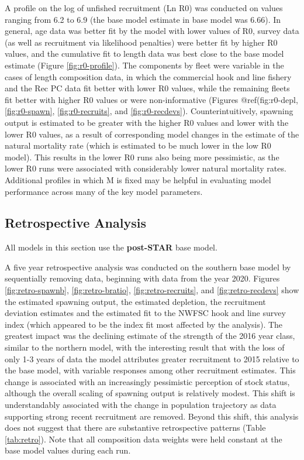 \documentclass[
  english,
  a4paper,
]{article}
\begin{document}
A profile on the log of unfished recruitment (Ln R0) was conducted on values ranging from 6.2 to 6.9 (the base model estimate in base model was 6.66). In general, age data was better fit by the model with lower values of R0, survey data (as well as recruitment via likelihood penalties) were better fit by higher R0 values, and the cumulative fit to length data was best close to the base model estimate (Figure \ref{fig:r0-profile}). The components by fleet were variable in the cases of length composition data, in which the commercial hook and line fishery and the Rec PC data fit better with lower R0 values, while the remaining fleets fit better with higher R0 values or were non-informative (Figures @ref(fig:r0-depl, \ref{fig:r0-spawn}, \ref{fig:r0-recruits}, and \ref{fig:r0-recdevs}). Counterintuitively, spawning output is estimated to be greater with the higher R0 values and lower with the lower R0 values, as a result of corresponding model changes in the estimate of the natural mortality rate (which is estimated to be much lower in the low R0 model). This results in the lower R0 runs also being more pessimistic, as the lower R0 runs were associated with considerably lower natural mortality rates. Additional profiles in which M is fixed may be helpful in evaluating model performance across many of the key model parameters.

\hypertarget{retrospective-analysis}{%
\subsection{Retrospective Analysis}\label{retrospective-analysis}}

All models in this section use the \textbf{post-STAR} base model.

A five year retrospective analysis was conducted on the southern base model by sequentially removing data, beginning with data from the year 2020. Figures \ref{fig:retro-spawnb}, \ref{fig:retro-bratio}, \ref{fig:retro-recruits}, and \ref{fig:retro-recdevs} show the estimated spawning output, the estimated depletion, the recruitment deviation estimates and the estimated fit to the NWFSC hook and line survey index (which appeared to be the index fit most affected by the analysis). The greatest impact was the declining estimate of the strength of the 2016 year class, similar to the northern model, with the interesting result that with the loss of only 1-3 years of data the model attributes greater recruitment to 2015 relative to the base model, with variable responses among other recruitment estimates. This change is associated with an increasingly pessimistic perception of stock status, although the overall scaling of spawning output is relatively modest. This shift is understandably associated with the change in population trajectory as data supporting strong recent recruitment are removed. Beyond this shift, this analysis does not suggest that there are substantive retrospective patterns (Table \ref{tab:retro}). Note that all composition data weights were held constant at the base model values during each run.
\end{document}
